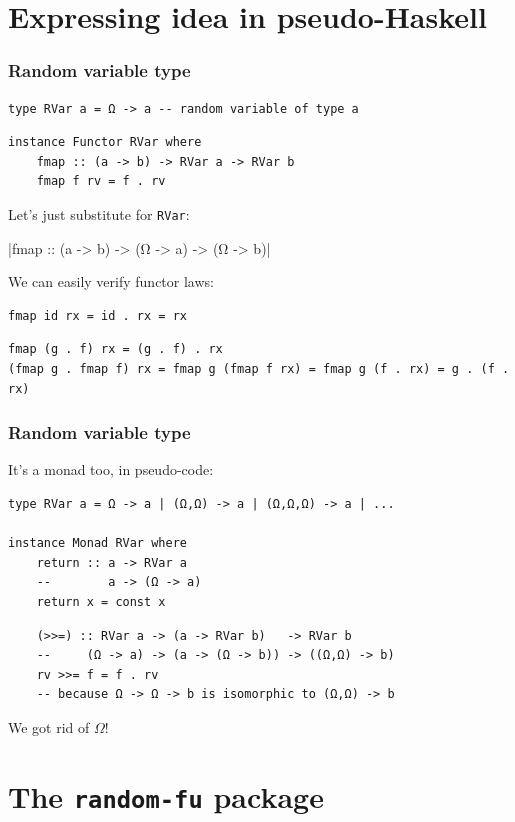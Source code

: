\documentclass[mathserif, 8pt]{beamer}
\begin{document}
\section{Expressing idea in pseudo-Haskell}

\begin{frame}[fragile]
  \frametitle{Random variable type}

\begin{verbatim}
type RVar a = Ω -> a -- random variable of type a
\end{verbatim}
  \pause
\begin{verbatim}
instance Functor RVar where
    fmap :: (a -> b) -> RVar a -> RVar b
    fmap f rv = f . rv
\end{verbatim}

\pause
  Let's just substitute for \verb|RVar|:

  |fmap :: (a -> b) -> (Ω -> a) -> (Ω -> b)|

  \pause
  We can easily verify functor laws:

\begin{verbatim}
fmap id rx = id . rx = rx
\end{verbatim}
  \pause
\begin{verbatim}
fmap (g . f) rx = (g . f) . rx
(fmap g . fmap f) rx = fmap g (fmap f rx) = fmap g (f . rx) = g . (f . rx)
\end{verbatim}
\end{frame}

\begin{frame}[fragile]
  \frametitle{Random variable type}
  It's a monad too, in pseudo-code:

\begin{verbatim}
type RVar a = Ω -> a | (Ω,Ω) -> a | (Ω,Ω,Ω) -> a | ...

instance Monad RVar where
    return :: a -> RVar a
    --        a -> (Ω -> a)
    return x = const x
\end{verbatim}
  \pause
\begin{verbatim}
    (>>=) :: RVar a -> (a -> RVar b)   -> RVar b
    --     (Ω -> a) -> (a -> (Ω -> b)) -> ((Ω,Ω) -> b)
    rv >>= f = f . rv
    -- because Ω -> Ω -> b is isomorphic to (Ω,Ω) -> b
\end{verbatim}
\pause
\alert{We got rid of $\Omega$!}

\end{frame}

\section{The \texttt{random-fu} package}
\end{document}
